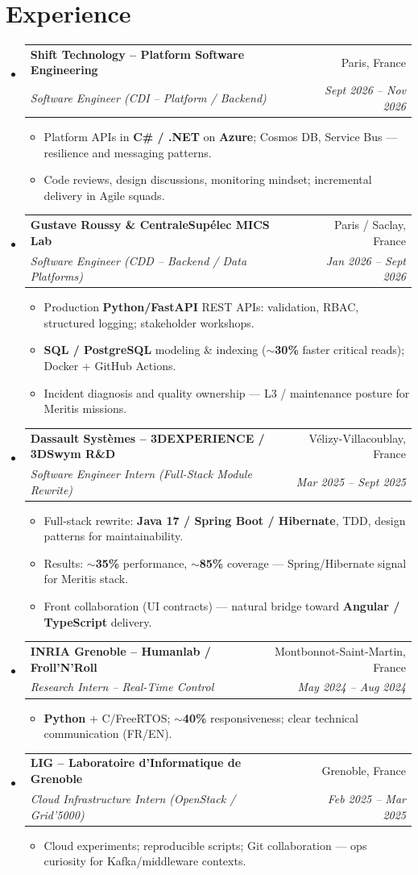\documentclass[letterpaper,10.5pt]{article}
\makeatletter
\newcommand{\resumeItem}[1]{\item\small{#1 \vspace{-1.5pt}}}
\newcommand{\resumeSubheading}[4]{\vspace{-1pt}\item\begin{tabular*}{0.97\textwidth}[t]{l@{\extracolsep{\fill}}r}\textbf{#1} & #2 \\\textit{\small#3} & \textit{\small #4} \\\end{tabular*}\vspace{-5pt}}
\newcommand{\resumeSubHeadingListStart}{\begin{itemize}[leftmargin=0.15in, label={}]}
\newcommand{\resumeSubHeadingListEnd}{\end{itemize}}
\newcommand{\resumeItemListStart}{\begin{itemize}[leftmargin=0.18in]}
\newcommand{\resumeItemListEnd}{\end{itemize}\vspace{-3pt}}
\makeatother
\begin{document}
\section{Experience}
\resumeSubHeadingListStart
  \resumeSubheading
    {Shift Technology -- Platform Software Engineering}{Paris, France}
    {Software Engineer (CDI -- Platform / Backend)}{Sept 2026 -- Nov 2026}
    \resumeItemListStart
      \resumeItem{Platform APIs in \textbf{C\# / .NET} on \textbf{Azure}; Cosmos DB, Service Bus --- resilience and messaging patterns.}
      \resumeItem{Code reviews, design discussions, monitoring mindset; incremental delivery in Agile squads.}
    \resumeItemListEnd
  \resumeSubheading
    {Gustave Roussy \& CentraleSup\'elec MICS Lab}{Paris / Saclay, France}
    {Software Engineer (CDD -- Backend / Data Platforms)}{Jan 2026 -- Sept 2026}
    \resumeItemListStart
      \resumeItem{Production \textbf{Python/FastAPI} REST APIs: validation, RBAC, structured logging; stakeholder workshops.}
      \resumeItem{\textbf{SQL / PostgreSQL} modeling \& indexing (\textbf{$\sim$30\%} faster critical reads); Docker + GitHub Actions.}
      \resumeItem{Incident diagnosis and quality ownership --- L3 / maintenance posture for Meritis missions.}
    \resumeItemListEnd
  \resumeSubheading
    {Dassault Syst\`emes -- 3DEXPERIENCE / 3DSwym R\&D}{V\'elizy-Villacoublay, France}
    {Software Engineer Intern (Full-Stack Module Rewrite)}{Mar 2025 -- Sept 2025}
    \resumeItemListStart
      \resumeItem{Full-stack rewrite: \textbf{Java 17 / Spring Boot / Hibernate}, TDD, design patterns for maintainability.}
      \resumeItem{Results: \textbf{$\sim$35\%} performance, \textbf{$\sim$85\%} coverage --- Spring/Hibernate signal for Meritis stack.}
      \resumeItem{Front collaboration (UI contracts) --- natural bridge toward \textbf{Angular / TypeScript} delivery.}
    \resumeItemListEnd
  \resumeSubheading
    {INRIA Grenoble -- Humanlab / Froll'N'Roll}{Montbonnot-Saint-Martin, France}
    {Research Intern -- Real-Time Control}{May 2024 -- Aug 2024}
    \resumeItemListStart
      \resumeItem{\textbf{Python} + C/FreeRTOS; \textbf{$\sim$40\%} responsiveness; clear technical communication (FR/EN).}
    \resumeItemListEnd
  \resumeSubheading
    {LIG -- Laboratoire d'Informatique de Grenoble}{Grenoble, France}
    {Cloud Infrastructure Intern (OpenStack / Grid'5000)}{Feb 2025 -- Mar 2025}
    \resumeItemListStart
      \resumeItem{Cloud experiments; reproducible scripts; Git collaboration --- ops curiosity for Kafka/middleware contexts.}
    \resumeItemListEnd
\resumeSubHeadingListEnd
\end{document}
